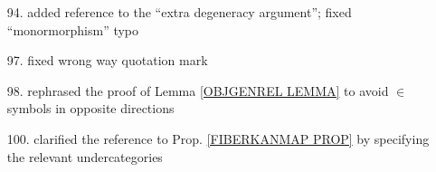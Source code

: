 \documentclass{article}
\begin{document}
\begin{itemize}
\item[94.] added \cite{Ri14} reference to the ``extra degeneracy argument''; fixed ``monormorphism'' typo

\item[97.] fixed wrong way quotation mark

\item[98.] rephrased the proof of Lemma \ref{OBJGENREL LEMMA}
to avoid $\in$ symbols in opposite directions

\item[100.] clarified the reference to Prop. \ref{FIBERKANMAP PROP} by specifying the relevant undercategories

\end{itemize}








{}


\end{document}
